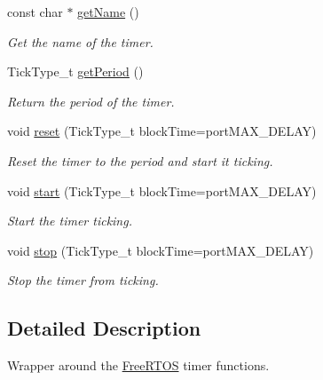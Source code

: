 \begin{DoxyCompactItemize}
const char $\ast$ \hyperlink{class_free_r_t_o_s_timer_a9ab13f95f2bcb12a65fee1775f9c40b8}{get\+Name} ()
\begin{DoxyCompactList}\small\item\em Get the name of the timer. \end{DoxyCompactList}\item 
Tick\+Type\+\_\+t \hyperlink{class_free_r_t_o_s_timer_a423965d8980aae6a1877b338a2d83d55}{get\+Period} ()
\begin{DoxyCompactList}\small\item\em Return the period of the timer. \end{DoxyCompactList}\item 
void \hyperlink{class_free_r_t_o_s_timer_ae1f243c23d6d6edece568fe0e9de0209}{reset} (Tick\+Type\+\_\+t block\+Time=port\+M\+A\+X\+\_\+\+D\+E\+L\+AY)\hypertarget{class_free_r_t_o_s_timer_ae1f243c23d6d6edece568fe0e9de0209}{}\label{class_free_r_t_o_s_timer_ae1f243c23d6d6edece568fe0e9de0209}

\begin{DoxyCompactList}\small\item\em Reset the timer to the period and start it ticking. \end{DoxyCompactList}\item 
void \hyperlink{class_free_r_t_o_s_timer_a4cad6643b084ed3813a424fa60547742}{start} (Tick\+Type\+\_\+t block\+Time=port\+M\+A\+X\+\_\+\+D\+E\+L\+AY)\hypertarget{class_free_r_t_o_s_timer_a4cad6643b084ed3813a424fa60547742}{}\label{class_free_r_t_o_s_timer_a4cad6643b084ed3813a424fa60547742}

\begin{DoxyCompactList}\small\item\em Start the timer ticking. \end{DoxyCompactList}\item 
void \hyperlink{class_free_r_t_o_s_timer_adfa6641c22dba498dcd44744294d072d}{stop} (Tick\+Type\+\_\+t block\+Time=port\+M\+A\+X\+\_\+\+D\+E\+L\+AY)\hypertarget{class_free_r_t_o_s_timer_adfa6641c22dba498dcd44744294d072d}{}\label{class_free_r_t_o_s_timer_adfa6641c22dba498dcd44744294d072d}

\begin{DoxyCompactList}\small\item\em Stop the timer from ticking. \end{DoxyCompactList}\end{DoxyCompactItemize}


\subsection{Detailed Description}
Wrapper around the \hyperlink{class_free_r_t_o_s}{Free\+R\+T\+OS} timer functions. 

